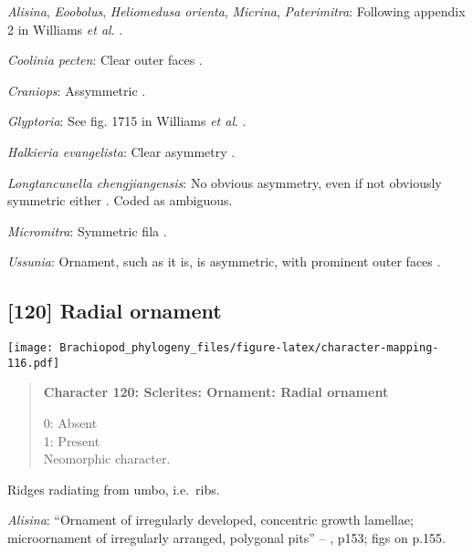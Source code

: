 \documentclass[openany]{book}
\theoremstyle{definition}
\theoremstyle{definition}
\theoremstyle{definition}
\theoremstyle{remark}
\begin{document}
\hypertarget{Alisina-coding-119}{}
\emph{Alisina}, \emph{Eoobolus}, \emph{Heliomedusa orienta},
\emph{Micrina}, \emph{Paterimitra}: Following appendix 2 in Williams
\emph{et al}. \citeyearpar{Williams1998Thediversity}.

\hypertarget{Coolinia_pecten-coding-119}{}
\emph{Coolinia pecten}: Clear outer faces \citep[fig.
100.2b]{Williams2000LinguliformeaCraniiformea}.

\hypertarget{Craniops-coding-119}{}
\emph{Craniops}: Assymmetric \citep[fig. 3]{Hanken1985Thetaxonomy}.

\hypertarget{Glyptoria-coding-119}{}
\emph{Glyptoria}: See fig. 1715 in Williams \emph{et al}.
\citeyearpar{Williams2007Supplement}.

\hypertarget{Halkieria_evangelista-coding-119}{}
\emph{Halkieria evangelista}: Clear asymmetry
\citep{Skovsted2015Theearly}.

\hypertarget{Longtancunella_chengjiangensis-coding-119}{}
\emph{Longtancunella chengjiangensis}: No obvious asymmetry, even if not
obviously symmetric either \citep{Holmer2008TheEarly}. Coded as
ambiguous.

\hypertarget{Micromitra-coding-119}{}
\emph{Micromitra}: Symmetric fila \citep{Balthasar2004Shellstructure}.

\hypertarget{Ussunia-coding-119}{}
\emph{Ussunia}: Ornament, such as it is, is asymmetric, with prominent
outer faces \citep{Skovsted2011Scleritomeconstruction}.

\subsection*{{[}120{]} Radial ornament}\label{radial-ornament}

\texttt{[image: Brachiopod\_phylogeny\_files/figure-latex/character-mapping-116.pdf]}

\begin{quote}
\textbf{Character 120: Sclerites: Ornament: Radial ornament}

0: Absent\\
1: Present\\
Neomorphic character.
\end{quote}

Ridges radiating from umbo, i.e.~ribs.

\hypertarget{Alisina-coding-120}{}
\emph{Alisina}: ``Ornament of irregularly developed, concentric growth
lamellae; microornament of irregularly arranged, polygonal pits'' --
\citet{Williams2000LinguliformeaCraniiformea}, p153; figs on p.155.
\end{document}

